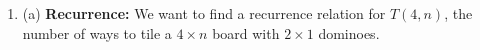 \documentclass[a4paper]{article}
\begin{document}
\begin{enumerate}

\item 

(a) \textbf{Recurrence:} We want to find a recurrence relation for $T(4, n)$, the number of ways to tile a $4 \times n$ board with $2 \times 1$ dominoes.\\


\end{enumerate}
\end{document}
